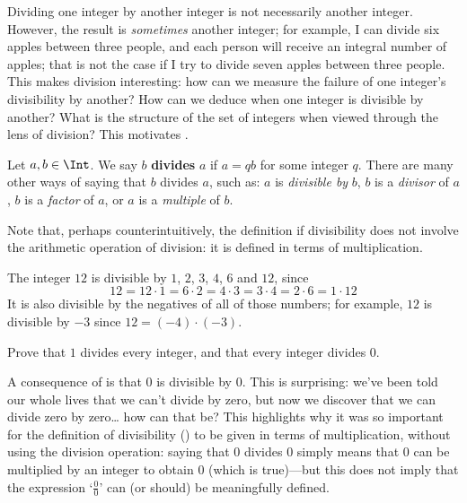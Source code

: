 Dividing one integer by another integer is not necessarily another integer. However, the result is \textit{sometimes} another integer; for example, I can divide six apples between three people, and each person will receive an integral number of apples; that is not the case if I try to divide seven apples between three people. This makes division interesting: how can we measure the failure of one integer's divisibility by another? How can we deduce when one integer is divisible by another? What is the structure of the set of integers when viewed through the lens of division? This motivates .

\begin{definition}
\label{defDivisionPreliminary}
Let $a,b \in \Int$. We say $b$ \textbf{divides} $a$ if $a=qb$ for some integer $q$. There are many other ways of saying that $b$ divides $a$, such as: $a$ is \textit{divisible by} $b$, $b$ is a \textit{divisor} of $a$, $b$ is a \textit{factor} of $a$, or $a$ is a \textit{multiple} of $b$.
\end{definition}

Note that, perhaps counterintuitively, the definition if divisibility does not involve the arithmetic operation of division: it is defined in terms of multiplication.

\begin{example}
The integer $12$ is divisible by $1$, $2$, $3$, $4$, $6$ and $12$, since
\[ 12 = 12 \cdot 1 = 6 \cdot 2 = 4 \cdot 3 = 3 \cdot 4 = 2 \cdot 6 = 1 \cdot 12 \]
It is also divisible by the negatives of all of those numbers; for example, $12$ is divisible by $-3$ since $12 = (-4) \cdot (-3)$.
\end{example}

\begin{exercise}
\label{exOneDividesEveryIntegerDividesZero}
Prove that $1$ divides every integer, and that every integer divides $0$.
\end{exercise}

A consequence of  is that $0$ is divisible by $0$. This is surprising: we've been told our whole lives that we can't divide by zero, but now we discover that we can divide zero by zero\dots{} how can that be? This highlights why it was so important for the definition of divisibility () to be given in terms of multiplication, without using the division operation: saying that $0$ divides $0$ simply means that $0$ can be multiplied by an integer to obtain $0$ (which is true)---but this does not imply that the expression `$\frac{0}{0}$' can (or should) be meaningfully defined.

